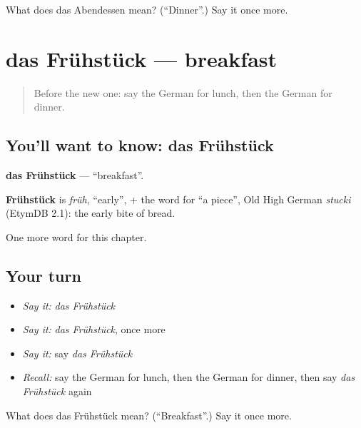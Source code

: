 \begin{tcolorbox}[breakable,colback=teal!4,colframe=teal!35!black,title={Before you move on}]
What does das Abendessen mean? (\textquotedblleft{}Dinner\textquotedblright{}.) Say it once more.
\end{tcolorbox}
\section[das Frühstück]{das Frühstück — breakfast}

\label{lesson:GE-C72-fruehstueck}



\begin{quote}
Before the new one: say the German for lunch, then the German for dinner.
\end{quote}

\subsection*{You'll want to know: das Frühstück}
\textbf{das Frühstück} — \textquotedblleft{}breakfast\textquotedblright{}.

\begin{cousinweb}
\textbf{Frühstück} is \emph{früh}, \textquotedblleft{}early\textquotedblright{}, + the word for \textquotedblleft{}a piece\textquotedblright{}, Old High German \emph{stucki} (EtymDB 2.1): the early bite of bread.
\end{cousinweb}

\begin{grammarlens}[title={What you've built}]
One more word for this chapter.
\end{grammarlens}

\subsection*{Your turn}
\begin{itemize}
\raggedright
  \item \emph{Say it:} \emph{das Frühstück}
  \item \emph{Say it:} \emph{das Frühstück}, once more
  \item \emph{Say it:} say \emph{das Frühstück}
  \item \emph{Recall:} say the German for lunch, then the German for dinner, then say \emph{das Frühstück} again
\end{itemize}

\begin{tcolorbox}[breakable,colback=teal!4,colframe=teal!35!black,title={Before you move on}]
What does das Frühstück mean? (\textquotedblleft{}Breakfast\textquotedblright{}.) Say it once more.
\end{tcolorbox}
